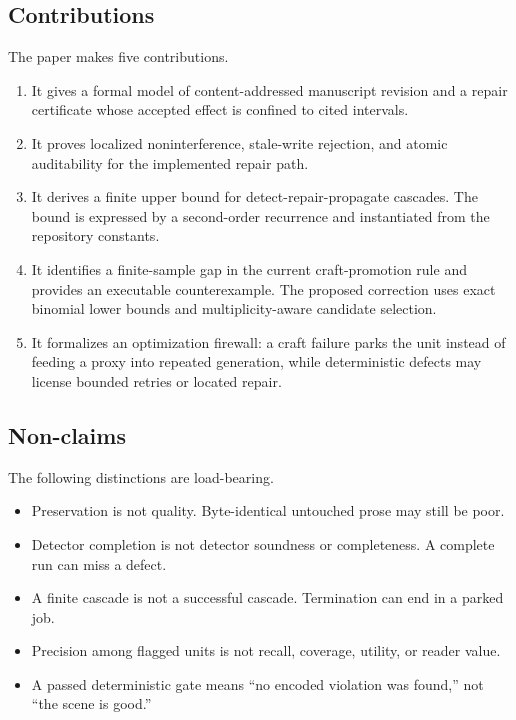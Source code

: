 \documentclass[11pt]{article}
\begin{document}
\subsection{Contributions}

The paper makes five contributions.

\begin{enumerate}
  \item It gives a formal model of content-addressed manuscript revision and a repair
  certificate whose accepted effect is confined to cited intervals.
  \item It proves localized noninterference, stale-write rejection, and atomic auditability
  for the implemented repair path.
  \item It derives a finite upper bound for detect-repair-propagate cascades. The bound is
  expressed by a second-order recurrence and instantiated from the repository constants.
  \item It identifies a finite-sample gap in the current craft-promotion rule and provides an
  executable counterexample. The proposed correction uses exact binomial lower bounds and
  multiplicity-aware candidate selection.
  \item It formalizes an optimization firewall: a craft failure parks the unit instead of
  feeding a proxy into repeated generation, while deterministic defects may license bounded
  retries or located repair.
\end{enumerate}

\subsection{Non-claims}

The following distinctions are load-bearing.

\begin{itemize}
  \item Preservation is not quality. Byte-identical untouched prose may still be poor.
  \item Detector completion is not detector soundness or completeness. A complete run can
  miss a defect.
  \item A finite cascade is not a successful cascade. Termination can end in a parked job.
  \item Precision among flagged units is not recall, coverage, utility, or reader value.
  \item A passed deterministic gate means ``no encoded violation was found,'' not ``the
  scene is good.''
\end{itemize}
\end{document}
